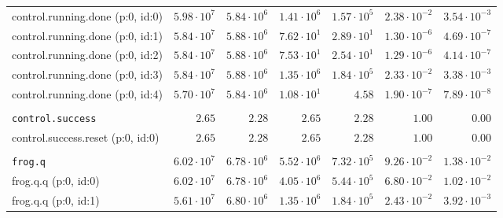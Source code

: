 \begin{table}[htbp]
{\begin{tabular}{lrrrrrr}
\hspace{3mm}control.running.done (p:0, id:0)  & $5.98 \cdot 10^{7}$ & $5.84 \cdot 10^{6}$ & $1.41 \cdot 10^{6}$ & $1.57 \cdot 10^{5}$ & $2.38 \cdot 10^{-2}$ & $3.54 \cdot 10^{-3}$ \\
\hspace{3mm}control.running.done (p:0, id:1)  & $5.84 \cdot 10^{7}$ & $5.88 \cdot 10^{6}$ & $7.62 \cdot 10^{1}$ & $2.89 \cdot 10^{1}$ & $1.30 \cdot 10^{-6}$ & $4.69 \cdot 10^{-7}$ \\
\hspace{3mm}control.running.done (p:0, id:2)  & $5.84 \cdot 10^{7}$ & $5.88 \cdot 10^{6}$ & $7.53 \cdot 10^{1}$ & $2.54 \cdot 10^{1}$ & $1.29 \cdot 10^{-6}$ & $4.14 \cdot 10^{-7}$ \\
\hspace{3mm}control.running.done (p:0, id:3)  & $5.84 \cdot 10^{7}$ & $5.88 \cdot 10^{6}$ & $1.35 \cdot 10^{6}$ & $1.84 \cdot 10^{5}$ & $2.33 \cdot 10^{-2}$ & $3.38 \cdot 10^{-3}$ \\
\hspace{3mm}control.running.done (p:0, id:4)  & $5.70 \cdot 10^{7}$ & $5.84 \cdot 10^{6}$ & $1.08 \cdot 10^{1}$ &              $4.58$ & $1.90 \cdot 10^{-7}$ & $7.89 \cdot 10^{-8}$ \\
\\[-8pt]\texttt{control.success}              &              $2.65$ &              $2.28$ &              $2.65$ &              $2.28$ &               $1.00$ &               $0.00$ \\
\hspace{3mm}control.success.reset (p:0, id:0) &              $2.65$ &              $2.28$ &              $2.65$ &              $2.28$ &               $1.00$ &               $0.00$ \\
\\[-8pt]\texttt{frog.q}                       & $6.02 \cdot 10^{7}$ & $6.78 \cdot 10^{6}$ & $5.52 \cdot 10^{6}$ & $7.32 \cdot 10^{5}$ & $9.26 \cdot 10^{-2}$ & $1.38 \cdot 10^{-2}$ \\
\hspace{3mm}frog.q.q (p:0, id:0)              & $6.02 \cdot 10^{7}$ & $6.78 \cdot 10^{6}$ & $4.05 \cdot 10^{6}$ & $5.44 \cdot 10^{5}$ & $6.80 \cdot 10^{-2}$ & $1.02 \cdot 10^{-2}$ \\
\hspace{3mm}frog.q.q (p:0, id:1)              & $5.61 \cdot 10^{7}$ & $6.80 \cdot 10^{6}$ & $1.35 \cdot 10^{6}$ & $1.84 \cdot 10^{5}$ & $2.43 \cdot 10^{-2}$ & $3.92 \cdot 10^{-3}$ \\

\end{tabular}}
\end{table}
